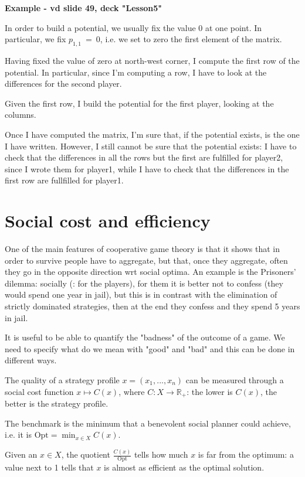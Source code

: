\bigskip
\noindent \textbf{Example - vd slide 49, deck "Lesson5"}

\noindent In order to build a potential, we usually fix the value 0 at one 
point. In particular, we fix $p_{1,1}~=~0$, i.e. we set to zero the first 
element of the matrix.

\noindent Having fixed the value of zero at north-west corner, I compute 
the first row of the potential. In particular, since I'm computing a row, 
I have to look at the differences for the second player.

\noindent Given the first row, I build the potential for the first player, 
looking at the columns.

\noindent Once I have computed the matrix, I'm sure that, if the potential 
exists, is the one I have written. However, I still cannot be sure that the 
potential exists: I have to check that the differences in all the rows but 
the first are fulfilled for player2, since I wrote them for player1, while 
I have to check that the differences in the first row are fullfilled for 
player1.

\section{Social cost and efficiency}

\noindent One of the main features of cooperative game theory is that it 
shows that in order to survive people have to aggregate, but that, once they 
aggregate, often they go in the opposite direction wrt social optima. An 
example is the Prisoners' dilemma: socially (: for the players), 
for them it is better not to confess (they would spend one year in jail), 
but this is in contrast with the elimination of strictly dominated strategies, 
then at the end they confess and they spend 5 years in jail.

\noindent It is useful to be able to quantify the "badness" of the outcome 
of a game. We need to specify what do we mean with "good" and "bad" and 
this can be done in different ways.

\noindent The quality of a strategy profile $x = (x_1,...,x_n)$ can be measured through a social cost function $x \mapsto C(x)$, where 
$C: X \rightarrow \mathbb{R}_+$: the lower is $C(x)$, the better is the strategy profile.

\noindent The benchmark is the minimum that a benevolent social planner could achieve, i.e. it is $\text{Opt} = \min_{x \in X}{C(x)}$.

\noindent Given an $x \in X$, the quotient $\frac{C(x)}{\text{Opt}}$ tells how much $x$ is far from the optimum: a value next to 1 tells that $x$ is almost as efficient as the optimal solution.

